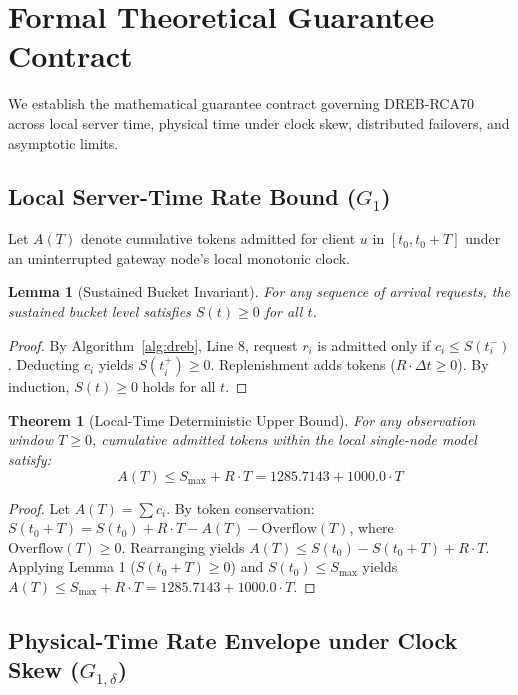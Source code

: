 \documentclass[conference]{IEEEtran}
\newtheorem{theorem}{Theorem}
\newtheorem{lemma}{Lemma}
\begin{document}
\section{Formal Theoretical Guarantee Contract}

We establish the mathematical guarantee contract governing DREB-RCA70 across local server time, physical time under clock skew, distributed failovers, and asymptotic limits.

\subsection{Local Server-Time Rate Bound ($G_1$)}
Let $A(T)$ denote cumulative tokens admitted for client $u$ in $[t_0, t_0 + T]$ under an uninterrupted gateway node's local monotonic clock.

\begin{lemma}[Sustained Bucket Invariant]
For any sequence of arrival requests, the sustained bucket level satisfies $S(t) \ge 0$ for all $t$.
\end{lemma}
\begin{proof}
By Algorithm~\ref{alg:dreb}, Line 8, request $r_i$ is admitted only if $c_i \le S(t_i^-)$. Deducting $c_i$ yields $S(t_i^+) \ge 0$. Replenishment adds tokens ($R \cdot \Delta t \ge 0$). By induction, $S(t) \ge 0$ holds for all $t$.
\end{proof}

\begin{theorem}[Local-Time Deterministic Upper Bound]
For any observation window $T \ge 0$, cumulative admitted tokens within the local single-node model satisfy:
\begin{equation}
A(T) \le S_{\max} + R \cdot T = 1285.7143 + 1000.0 \cdot T
\end{equation}
\end{theorem}
\begin{proof}
Let $A(T) = \sum c_i$. By token conservation: $S(t_0 + T) = S(t_0) + R \cdot T - A(T) - \text{Overflow}(T)$, where $\text{Overflow}(T) \ge 0$. Rearranging yields $A(T) \le S(t_0) - S(t_0 + T) + R \cdot T$. Applying Lemma 1 ($S(t_0 + T) \ge 0$) and $S(t_0) \le S_{\max}$ yields $A(T) \le S_{\max} + R \cdot T = 1285.7143 + 1000.0 \cdot T$.
\end{proof}

\subsection{Physical-Time Rate Envelope under Clock Skew ($G_{1,\delta}$)}
\end{document}
